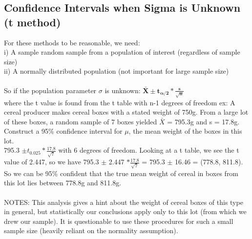 \documentclass[12pt, a4paper]{article}
\begin{document}
	\subsection{Confidence Intervals when Sigma is Unknown (t method)}
	For these methods to be reasonable, we need: \\
	i) A sample random sample from a population of interest (regardless of sample size) \\
	ii) A normally distributed population (not important for large sample size)\\~\\
	So if the population parameter $\sigma$ is unknown:
	\large $\mathbf{\bar{X} \pm t_{\alpha/2}*\frac{s}{\sqrt{n}}}$ \normalsize \\
	where the t value is found from the t table with n-1 degrees of freedom \newpage
	\noindent ex: A cereal producer makes cereal boxes with a stated weight of 750g. From a large lot of these boxes, a random sample of 7 boxes yielded $\bar{X}$ = 795.3g and s = 17.8g. Construct a 95\% confidence interval for $\mu$, the mean weight of the boxes in this lot. \\
	795.3 $\pm t_{0.025}*\frac{17.8}{\sqrt{7}}$ with 6 degrees of freedom. Looking at a t table, we see the t value of 2.447, so we have 795.3 $\pm$ 2.447 $*\frac{17.8}{\sqrt{7}}$ = 795.3 $\pm$ 16.46 = (778.8, 811.8). So we can be 95\% confident that the true mean weight of cereal in boxes from this lot lies between 778.8g and 811.8g. \\~\\
	NOTES: This analysis gives a hint about the weight of cereal boxes of this type in general, but statistically our conclusions apply only to this lot (from which we drew our sample). It is questionable to use these procedures for such a small sample size (heavily reliant on the normality assumption). \\~\\
	
\end{document}
